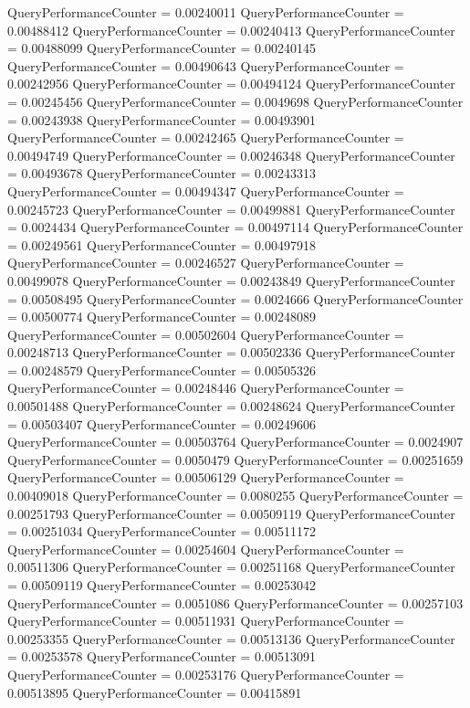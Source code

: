 \documentclass[9pt]{article}
\theoremstyle{plain}
\theoremstyle{definition}
\theoremstyle{remark}
\numberwithin{equation}{section}
\begin{document}
QueryPerformanceCounter  =  0.00240011
QueryPerformanceCounter  =  0.00488412
QueryPerformanceCounter  =  0.00240413
QueryPerformanceCounter  =  0.00488099
QueryPerformanceCounter  =  0.00240145
QueryPerformanceCounter  =  0.00490643
QueryPerformanceCounter  =  0.00242956
QueryPerformanceCounter  =  0.00494124
QueryPerformanceCounter  =  0.00245456
QueryPerformanceCounter  =  0.0049698
QueryPerformanceCounter  =  0.00243938
QueryPerformanceCounter  =  0.00493901
QueryPerformanceCounter  =  0.00242465
QueryPerformanceCounter  =  0.00494749
QueryPerformanceCounter  =  0.00246348
QueryPerformanceCounter  =  0.00493678
QueryPerformanceCounter  =  0.00243313
QueryPerformanceCounter  =  0.00494347
QueryPerformanceCounter  =  0.00245723
QueryPerformanceCounter  =  0.00499881
QueryPerformanceCounter  =  0.0024434
QueryPerformanceCounter  =  0.00497114
QueryPerformanceCounter  =  0.00249561
QueryPerformanceCounter  =  0.00497918
QueryPerformanceCounter  =  0.00246527
QueryPerformanceCounter  =  0.00499078
QueryPerformanceCounter  =  0.00243849
QueryPerformanceCounter  =  0.00508495
QueryPerformanceCounter  =  0.0024666
QueryPerformanceCounter  =  0.00500774
QueryPerformanceCounter  =  0.00248089
QueryPerformanceCounter  =  0.00502604
QueryPerformanceCounter  =  0.00248713
QueryPerformanceCounter  =  0.00502336
QueryPerformanceCounter  =  0.00248579
QueryPerformanceCounter  =  0.00505326
QueryPerformanceCounter  =  0.00248446
QueryPerformanceCounter  =  0.00501488
QueryPerformanceCounter  =  0.00248624
QueryPerformanceCounter  =  0.00503407
QueryPerformanceCounter  =  0.00249606
QueryPerformanceCounter  =  0.00503764
QueryPerformanceCounter  =  0.0024907
QueryPerformanceCounter  =  0.0050479
QueryPerformanceCounter  =  0.00251659
QueryPerformanceCounter  =  0.00506129
QueryPerformanceCounter  =  0.00409018
QueryPerformanceCounter  =  0.0080255
QueryPerformanceCounter  =  0.00251793
QueryPerformanceCounter  =  0.00509119
QueryPerformanceCounter  =  0.00251034
QueryPerformanceCounter  =  0.00511172
QueryPerformanceCounter  =  0.00254604
QueryPerformanceCounter  =  0.00511306
QueryPerformanceCounter  =  0.00251168
QueryPerformanceCounter  =  0.00509119
QueryPerformanceCounter  =  0.00253042
QueryPerformanceCounter  =  0.0051086
QueryPerformanceCounter  =  0.00257103
QueryPerformanceCounter  =  0.00511931
QueryPerformanceCounter  =  0.00253355
QueryPerformanceCounter  =  0.00513136
QueryPerformanceCounter  =  0.00253578
QueryPerformanceCounter  =  0.00513091
QueryPerformanceCounter  =  0.00253176
QueryPerformanceCounter  =  0.00513895
QueryPerformanceCounter  =  0.00415891
\end{document}
